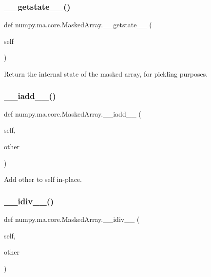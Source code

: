 \subsubsection{\texorpdfstring{\+\_\+\+\_\+getstate\+\_\+\+\_\+()}{\_\_getstate\_\_()}}
{\footnotesize\ttfamily def numpy.\+ma.\+core.\+Masked\+Array.\+\_\+\+\_\+getstate\+\_\+\+\_\+ (\begin{DoxyParamCaption}\item[{}]{self }\end{DoxyParamCaption})}

\begin{DoxyVerb}Return the internal state of the masked array, for pickling
purposes.\end{DoxyVerb}
 \mbox{\label{classnumpy_1_1ma_1_1core_1_1MaskedArray_a721643c8de34c633b4c93784472861ef}} 
\subsubsection{\texorpdfstring{\+\_\+\+\_\+iadd\+\_\+\+\_\+()}{\_\_iadd\_\_()}}
{\footnotesize\ttfamily def numpy.\+ma.\+core.\+Masked\+Array.\+\_\+\+\_\+iadd\+\_\+\+\_\+ (\begin{DoxyParamCaption}\item[{}]{self,  }\item[{}]{other }\end{DoxyParamCaption})}

\begin{DoxyVerb}Add other to self in-place.\end{DoxyVerb}
 \mbox{\label{classnumpy_1_1ma_1_1core_1_1MaskedArray_a1dda203fd385f64c59d8cc4fbf80288a}} 
\subsubsection{\texorpdfstring{\+\_\+\+\_\+idiv\+\_\+\+\_\+()}{\_\_idiv\_\_()}}
{\footnotesize\ttfamily def numpy.\+ma.\+core.\+Masked\+Array.\+\_\+\+\_\+idiv\+\_\+\+\_\+ (\begin{DoxyParamCaption}\item[{}]{self,  }\item[{}]{other }\end{DoxyParamCaption})}

